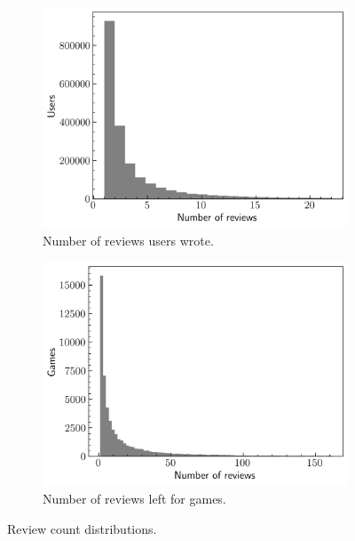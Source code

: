 \begin{figure}[ht]
    \centering
    \begin{subfigure}[ht]{0.49\textwidth}
        \centering
        \includegraphics[width=\textwidth]{figures/03_dataset/04_hist_user_reviews.png}
        \caption{Number of reviews users wrote.}
        \label{fig:Dataset_HistUserReviews}
    \end{subfigure}
    \hfill
    \begin{subfigure}[ht]{0.49\textwidth}
        \centering
        \includegraphics[width=\textwidth]{figures/03_dataset/05_hist_game_reviews.png}
        \caption{Number of reviews left for games.}
        \label{fig:Dataset_HistGameReviews}
    \end{subfigure}
    \caption{Review count distributions.}
    \label{fig:Dataset_HistsReviews}
\end{figure}

